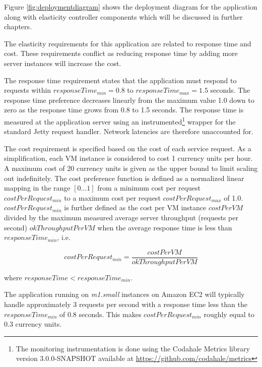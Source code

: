 \documentclass[english]{tktltiki2}
\theoremstyle{definition}
\theoremstyle{remark}
\begin{document}
Figure \ref{fig:deploymentdiagram} shows the deployment diagram for the
application along with elasticity controller components which will be discussed
in further chapters.


The elasticity requirements for this application are related to response time
and cost. These requirements conflict as reducing response time by adding more
server instances will increase the cost.

The response time requirement states that the application must respond to
requests within $responseTime_{min} = 0.8$ to $responseTime_{max} = 1.5$
seconds. The response time preference decreases linearly from the maximum value
1.0 down to zero as the response time grows from 0.8 to 1.5 seconds.  The response time is
measured at the application server using an instrumented\footnote{The monitoring
instrumentation is done using the Codahale Metrics library version
3.0.0-SNAPSHOT available at \url{https://github.com/codahale/metrics}} wrapper
for the standard Jetty request handler. Network latencies are therefore
unaccounted for.

The cost requirement is specified based on the cost of each service request. As
a simplification, each VM instance is considered to cost 1 currency units per
hour. A maximum cost of 20 currency units is given as the upper bound to limit
scaling out indefinitely. The cost preference function is defined as a
normalized linear mapping in the range $[0\dots1]$ from a minimum cost per
request $costPerRequest_{min}$ to a maximum cost per request
$costPerRequest_{max}$ of 1.0. $costPerRequest_{min}$ is further defined as the
cost per VM instance $costPerVM$ divided by the maximum measured average server
throughput (requests per second) $okThroughputPerVM$ when the average response
time is less than $responseTime_{min}$, i.e.

\[
costPerRequest_{min} = 
\frac{costPerVM}{okThroughputPerVM} 
\]

where $responseTime < responseTime_{min}$.

The application running on \textit{m1.small} instances on Amazon EC2 will
typically handle approximately 3 requests per second with a response time less
than the $responseTime_{min}$ of 0.8 seconds. This makes $costPerRequest_{min}$
roughly equal to 0.3 currency units.
\end{document}
